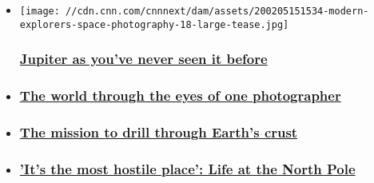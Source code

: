 \begin{itemize}
\item
  \href{/2020/02/21/world/modern-explorers-junocam-nasa-photography-intl-scn/index.html}{}

  \texttt{[image: //cdn.cnn.com/cnnnext/dam/assets/200205151534-modern-explorers-space-photography-18-large-tease.jpg]}

  \hypertarget{jupiter-as-youve-never-seen-it-before}{%
  \subsubsection{\texorpdfstring{\href{/2020/02/21/world/modern-explorers-junocam-nasa-photography-intl-scn/index.html}{Jupiter
  as you've never seen it
  before}}{Jupiter as you've never seen it before}}\label{jupiter-as-youve-never-seen-it-before}}
\item
  \hypertarget{the-world-through-the-eyes-of-one-photographer}{%
  \subsubsection{\texorpdfstring{\href{/travel/article/michael-poliza-photographer-modern-explorers-intl/index.html}{The
  world through the eyes of one
  photographer}}{The world through the eyes of one photographer}}\label{the-world-through-the-eyes-of-one-photographer}}
\item
  \hypertarget{the-mission-to-drill-through-earths-crust}{%
  \subsubsection{\texorpdfstring{\href{/2020/02/04/world/modern-explorers-ocean-drilling-iodp/index.html}{The
  mission to drill through Earth's
  crust}}{The mission to drill through Earth's crust}}\label{the-mission-to-drill-through-earths-crust}}
\item
  \hypertarget{its-the-most-hostile-place-life-at-the-north-pole}{%
  \subsubsection{\texorpdfstring{\href{/travel/article/inge-solheim-modern-explorers/index.html}{'It's
  the most hostile place': Life at the North
  Pole}}{'It's the most hostile place': Life at the North Pole}}\label{its-the-most-hostile-place-life-at-the-north-pole}}
\end{itemize}

